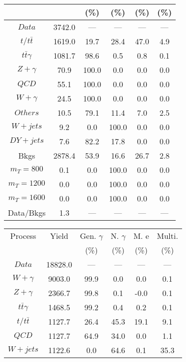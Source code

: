 \begin{figure}
\begin{minipage}[c]{0.32\textwidth}
{\begin{tabular}{cccccc}
 &  & (\%) & (\%) & (\%) & (\%)  \\
\hline
                                                                      $ Data $ &  3742.0 &  --- &  --- &  --- &  ---\\
$ t/t\bar{t} $ &  1619.0 &  19.7 &  28.4 &  47.0 &  4.9\\
$ t\bar{t}\gamma $ &  1081.7 &  98.6 &  0.5 &  0.8 &  0.1\\
$ Z+\gamma $ &  70.9 &  100.0 &  0.0 &  0.0 &  0.0\\
$ QCD $ &  55.1 &  100.0 &  0.0 &  0.0 &  0.0\\
$ W+\gamma $ &  24.5 &  100.0 &  0.0 &  0.0 &  0.0\\
$ Others $ &  10.5 &  79.1 &  11.4 &  7.0 &  2.5\\
$ W+jets $ &  9.2 &  0.0 &  100.0 &  0.0 &  0.0\\
$ DY+jets $ &  7.6 &  82.2 &  17.8 &  0.0 &  0.0\\
Bkgs &  2878.4 &  53.9 &  16.6 &  26.7 &  2.8\\
$ m_{T} = 800 $ &  0.1 &  0.0 &  100.0 &  0.0 &  0.0\\
$ m_{T} = 1200 $ &  0.0 &  0.0 &  100.0 &  0.0 &  0.0\\
$ m_{T} = 1600 $ &  0.0 &  0.0 &  100.0 &  0.0 &  0.0\\
Data/Bkgs &  1.3 &  --- &  --- &  --- &  ---\\
\hline
\end{tabular}
}
\end{minipage}
\begin{minipage}[c]{0.32\textwidth}
\centering
\tiny{
\begin{tabular}{cccccc}
\hline
Process & Yield & Gen. $\gamma$ & N. $\gamma$ & M. e & Multi. \\
 &  & (\%) & (\%) & (\%) & (\%)  \\
\hline
                                                                      $ Data $ &  18828.0 &  --- &  --- &  --- &  ---\\
$ W+\gamma $ &  9003.0 &  99.9 &  0.0 &  0.0 &  0.1\\
$ Z+\gamma $ &  2366.7 &  99.8 &  0.1 &  -0.0 &  0.1\\
$ t\bar{t}\gamma $ &  1468.5 &  99.2 &  0.4 &  0.2 &  0.1\\
$ t/t\bar{t} $ &  1127.7 &  26.4 &  45.3 &  19.1 &  9.1\\
$ QCD $ &  1127.7 &  64.9 &  34.0 &  0.0 &  1.1\\
$ W+jets $ &  1122.6 &  0.0 &  64.6 &  0.1 &  35.3\\

\end{tabular}}
\end{minipage}
\end{figure}
